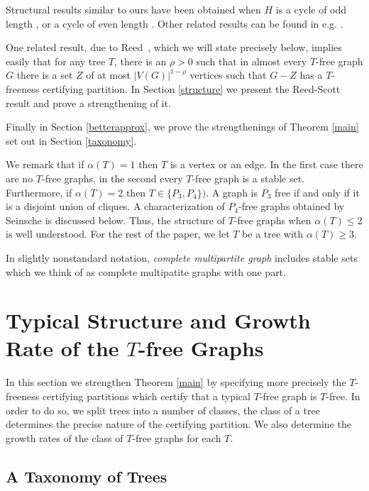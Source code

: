 \documentclass[12pt]{article}
\theoremstyle{definition}
\begin{document}
Structural results similar to ours have been obtained when $H$ is a cycle of odd length \cite{PS92,BB11}, or a cycle of even length \cite{PS91,R,KKOT15}.  
Other related results can be found in e.g. \cite{BaBS11,BB11,EKR76,PRY18,PS91}.


One related result, due to Reed~\cite{R},  which we will state precisely below,  implies easily that 
for any tree $T$, there is an $\rho>0$ such that in almost every $T$-free graph  $G$ there is a set $Z$ of at most $|V(G)|^{1-\rho}$ 
vertices such that $G-Z$ has a $T$-freeness certifying partition. 
In Section \ref{structure} we present the Reed-Scott result and  prove a strengthening of it. 

Finally in Section \ref{betterapprox},  we prove the strengthenings of Theorem \ref{main} set out in Section \ref{taxonomy}. 


We remark that if $\alpha(T)=1$ then $T$ is a vertex or an edge. In the first case  there are no $T$-free graphs,
in the second every $T$-free graph is a stable set. Furthermore,  if $\alpha(T)=2$   then  $T \in \{P_3,P_4\})$. A graph is $P_3$ free if and only if it is a disjoint union of cliques. 
A characterization of $P_4$-free graphs obtained by Seinsche is discussed below. Thus, the structure of $T$-free graphs when $\alpha(T) \le 2$ is well understood. 
For the rest of the paper,
we let $T$ be a tree with $\alpha(T) \ge 3$.

In  slightly nonstandard notation, {\it complete multipartite graph} includes stable sets which we think of as  complete multipatite graphs with one part. 

\section{Typical  Structure and Growth Rate of the $T$-free Graphs}

In this section we strengthen Theorem \ref{main} by specifying more precisely the $T$-freeness certifying partitions which 
certify that a typical $T$-free graph is $T$-free. In order to do so, we split  trees into a number of classes, the class of a tree 
determines the precise nature of the certifying partition. We also determine the growth rates of the class of $T$-free graphs for each $T$. 
\label{taxonomy}

\subsection{A Taxonomy of Trees}
\end{document}
